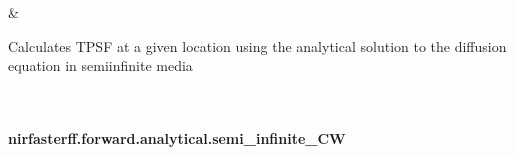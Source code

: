\documentclass[letterpaper,10pt,english]{sphinxmanual}
\begin{document}
\begin{savenotes}
\begin{longtable}{}
\begin{varwidth}[t]{}
\sphinxbeforeendvarwidth
\end{varwidth}%
&\begin{varwidth}[t]{}
\sphinxAtStartPar
Calculates TPSF at a given location using the analytical solution to the diffusion equation in semi\sphinxhyphen{}infinite media
\sphinxbeforeendvarwidth
\end{varwidth}%
\\
\sphinxbottomrule
\end{longtable}
\sphinxtableafterendhook
\sphinxatlongtableend
\end{savenotes}

\sphinxstepscope


\paragraph{nirfasterff.forward.analytical.semi\_infinite\_CW}
\label{\detokenize{_autosummary/nirfasterff.forward.analytical.semi_infinite_CW:nirfasterff-forward-analytical-semi-infinite-cw}}\label{\detokenize{_autosummary/nirfasterff.forward.analytical.semi_infinite_CW::doc}}
\end{document}
